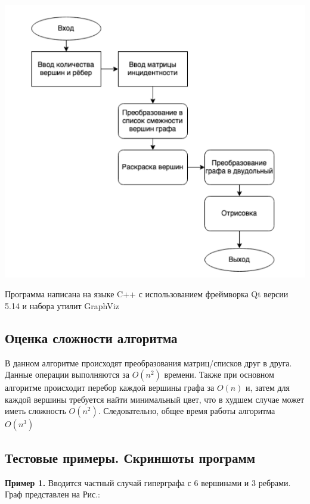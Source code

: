 \documentclass[a4paper, 12pt]{article}
\begin{document}
    \includegraphics{8_block}

Программа написана на языке C++ с использованием фреймворка Qt версии 5.14 и набора утилит GraphViz

\subsection{Оценка сложности алгоритма}
В данном алгоритме происходят преобразования матриц/списков друг в друга. 
Данные операции выполняются за $O(n^2)$ времени. Также при основном алгоритме происходит перебор каждой вершины графа за $O(n)$ и, 
затем для каждой вершины требуется найти минимальный цвет, что в худшем случае может иметь сложность $O(n^2)$. 
Следовательно, общее время работы алгоритма $O(n^3)$

\subsection{Тестовые примеры. Скриншоты программ}

\textbf{Пример 1.} Вводится частный случай гиперграфа с 6 вершинами и 3 ребрами. Граф представлен на Рис.:
\end{document}
